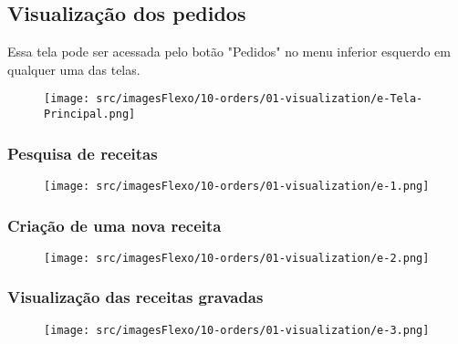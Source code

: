 \thispagestyle{fancy}
\vspace*{40 pt}
\subsection{Visualização dos pedidos}
 Essa tela pode ser acessada pelo botão "Pedidos" no menu inferior esquerdo em qualquer uma das telas.
 \vspace*{\fill}
 \begin{figure}[h]
  \centering
  \texttt{[image: src/imagesFlexo/10-orders/01-visualization/e-Tela-Principal.png]}
\end{figure}
\vspace*{\fill}

\newpage
\thispagestyle{fancy}
\vspace*{40 pt}
\subsubsection{\small{Pesquisa de receitas}}
\vspace*{\fill}
\begin{figure}[h]
  \centering
  \texttt{[image: src/imagesFlexo/10-orders/01-visualization/e-1.png]}
\end{figure}
\vspace*{\fill}

\newpage
\thispagestyle{fancy}
\vspace*{40 pt}
\subsubsection{\small{Criação de uma nova receita}}
\vspace*{\fill}
\begin{figure}[h]
  \centering
  \texttt{[image: src/imagesFlexo/10-orders/01-visualization/e-2.png]}
\end{figure}
\vspace*{\fill}

\newpage
\thispagestyle{fancy}
\vspace*{40 pt}
\subsubsection{\small{Visualização das receitas gravadas}}
\vspace*{\fill}
\begin{figure}[h]
  \centering
  \texttt{[image: src/imagesFlexo/10-orders/01-visualization/e-3.png]}
\end{figure}
\vspace*{\fill}


